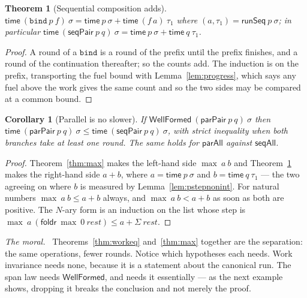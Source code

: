 \documentclass[11pt,a4paper]{article}
\theoremstyle{definition}
\theoremstyle{plain}
\newtheorem{theorem}[definition]{Theorem}
\newtheorem{corollary}[definition]{Corollary}
\theoremstyle{remark}
\newenvironment{moral}{\par\medskip\noindent\textit{The moral.}\ \ignorespaces}{\par\medskip}
\newcommand{\st}{\sigma}
\newcommand{\runSeq}{\mathsf{runSeq}}
\newcommand{\wf}{\mathsf{WellFormed}}
\newcommand{\spn}{\mathsf{time}}
\begin{document}
\begin{theorem}[Sequential composition adds]\label{thm:seqadd}
$\spn\ (\texttt{bind}\ p\ f)\ \st = \spn\ p\ \st + \spn\ (f\,a)\ \tau_1$ where
$(a,\tau_1) = \runSeq\ p\ \st$; in particular
$\spn\ (\mathsf{seqPair}\ p\ q)\ \st = \spn\ p\ \st + \spn\ q\ \tau_1$.
\end{theorem}

\begin{proof}
A round of a $\texttt{bind}$ is a round of the prefix until the prefix finishes, and a round of
the continuation thereafter; so the counts add. The induction is on the prefix, transporting
the fuel bound with Lemma~\ref{lem:progress}, which says any fuel above the work gives the
same count and so the two sides may be compared at a common bound.
\end{proof}

\begin{corollary}[Parallel is no slower]\label{cor:faster}
If $\wf\ (\mathsf{parPair}\ p\ q)\ \st$ then
$\spn\ (\mathsf{parPair}\ p\ q)\ \st \le \spn\ (\mathsf{seqPair}\ p\ q)\ \st$, with strict
inequality when both branches take at least one round. The same holds for $\mathsf{parAll}$
against $\mathsf{seqAll}$.
\end{corollary}

\begin{proof}
Theorem~\ref{thm:max} makes the left-hand side $\max\ a\ b$ and Theorem~\ref{thm:seqadd} makes
the right-hand side $a + b$, where $a = \spn\ p\ \st$ and $b = \spn\ q\ \tau_1$ --- the two
agreeing on where $b$ is measured by Lemma~\ref{lem:pstepnonint}. For natural numbers
$\max\ a\ b \le a + b$ always, and $\max\ a\ b < a + b$ as soon as both are positive. The
$N$-ary form is an induction on the list whose step is
$\max\ a\ (\mathsf{foldr}\ \max\ 0\ \mathit{rest}) \le a + \Sigma\ \mathit{rest}$.
\end{proof}

\begin{moral}
Theorems~\ref{thm:workeq} and~\ref{thm:max} together are the separation: the same operations,
fewer rounds. Notice which hypotheses each needs. Work invariance needs none, because it is a
statement about the canonical run. The span law needs $\wf$, and needs it essentially --- as
the next example shows, dropping it breaks the conclusion and not merely the proof.
\end{moral}
\end{document}
